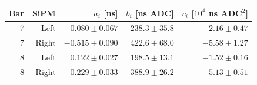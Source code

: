 \begin{tabular}{rrrrr}
\toprule
Bar & SiPM & $a_i$ [ns] & $b_i$ [ns ADC] & $c_i$ [$10^4$ ns ADC$^2$]\\
\midrule
7 & Left & $0.080 \pm 0.067$ & $238.3 \pm 35.8$ & $-2.16 \pm 0.47$\\
7 & Right & $-0.515 \pm 0.090$ & $422.6 \pm 68.0$ & $-5.58 \pm 1.27$\\
8 & Left & $0.122 \pm 0.027$ & $198.5 \pm 13.1$ & $-1.52 \pm 0.16$\\
8 & Right & $-0.229 \pm 0.033$ & $388.9 \pm 26.2$ & $-5.13 \pm 0.51$\\
\bottomrule
\end{tabular}
